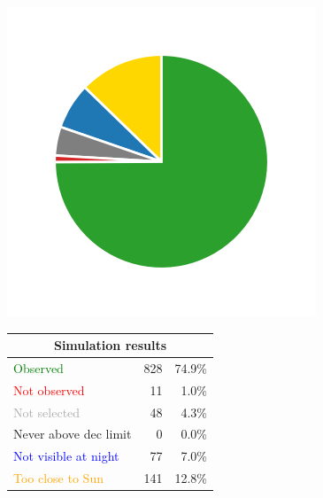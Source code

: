 \begin{colsection}
\begin{colsection}
\begin{figure}[p]
    \begin{center}
        \begin{minipage}[t]{0.15\textwidth}\vspace{0.6cm}
            \includegraphics[trim={.5cm 0 .5cm 0},clip,width=\linewidth]{images/gw_sims/2n8+2k8_pie.png}
        \end{minipage}
        \begin{minipage}[t]{0.45\textwidth}\vspace{0pt}
            \begin{tabular}{lrr}
                \multicolumn{3}{c}{\textbf{Simulation results}} \\
                \midrule
                \textcolor{Green}{Observed} & 828 & 74.9\% \\
                \textcolor{Red}{Not observed} & 11 & 1.0\% \\
                \textcolor{darkgray}{Not selected} & 48 & 4.3\% \\
                \textcolor{NavyBlue}{Never above dec limit} & 0 & 0.0\% \\
                \textcolor{Blue}{Not visible at night} & 77 & 7.0\% \\
                \textcolor{Orange}{Too close to Sun} & 141 & 12.8\% \\

\end{tabular}
\end{minipage}
\end{center}
\end{figure}
\end{colsection}
\end{colsection}
